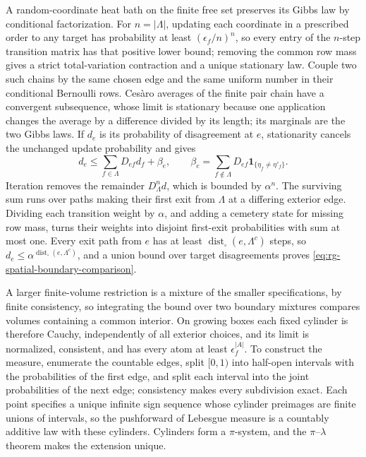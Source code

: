A random-coordinate heat bath on the finite free set preserves its Gibbs
law by conditional factorization. For \(n=|\Lambda|\), updating each
coordinate in a prescribed order to any target has probability at least
\((\epsilon_f/n)^n\), so every entry of the \(n\)-step transition matrix
has that positive lower bound; removing the common row mass gives a strict
total-variation contraction and a unique stationary law. Couple two such
chains by the same chosen edge and the same uniform number in their
conditional Bernoulli rows. Ces\`aro averages of the finite pair chain have
a convergent subsequence, whose limit is stationary because one application
changes the average by a difference divided by its length; its marginals
are the two Gibbs laws. If \(d_e\) is its probability of disagreement at
\(e\), stationarity cancels the unchanged update probability and gives
\begin{equation}
 d_e\le\sum_{f\in\Lambda}D_{ef}d_f+\beta_e,
 \qquad \beta_e=\sum_{f\notin\Lambda}D_{ef}
                           \mathbf1_{\{\eta_f\ne\eta'_f\}}.
 \label{eq:rg-spatial-proof-stationary-comparison}
\end{equation}
Iteration removes the remainder \(D_\Lambda^nd\), which is bounded by
\(\alpha^n\). The surviving sum runs over paths making their first exit
from \(\Lambda\) at a differing exterior edge. Dividing each transition
weight by \(\alpha\), and adding a cemetery state for missing row mass,
turns their weights into disjoint first-exit probabilities with sum at most
one. Every exit path from \(e\) has at least \(\operatorname{dist}_\square(e,\Lambda^c)\) steps, so
\(d_e\le\alpha^{\operatorname{dist}_\square(e,\Lambda^c)}\), and a union bound over target
disagreements proves \cref{eq:rg-spatial-boundary-comparison}.

A larger finite-volume restriction is a mixture of the smaller
specifications, by finite consistency, so integrating the bound over two
boundary mixtures compares volumes containing a common interior. On growing
boxes each fixed cylinder is therefore Cauchy, independently of all
exterior choices, and its limit is normalized, consistent, and has every
atom at least \(\epsilon_f^{|A|}\). To construct the measure, enumerate the
countable edges, split \([0,1)\) into half-open intervals with the
probabilities of the first edge, and split each interval into the joint
probabilities of the next edge; consistency makes every subdivision exact.
Each point specifies a unique infinite sign sequence whose cylinder
preimages are finite unions of intervals, so the pushforward of Lebesgue
measure is a countably additive law with these cylinders. Cylinders form a
\(\pi\)-system, and the \(\pi\)--\(\lambda\) theorem makes the extension
unique.

